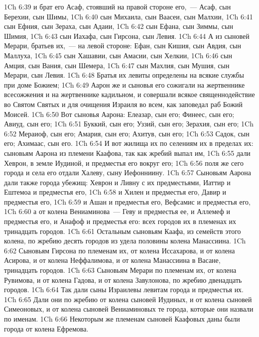\vs 1Ch 6:39 и брат его Асаф, стоявший на правой стороне его,~--- Асаф, сын Берехии, сын Шимы,
\vs 1Ch 6:40 сын Михаила, сын Ваасеи, сын Малхии,
\vs 1Ch 6:41 сын Ефния, сын Зераха, сын Адаии,
\vs 1Ch 6:42 сын Ефана, сын Зиммы, сын Шимия,
\vs 1Ch 6:43 сын Иахафа, сын Гирсона, сын Левия.
\rsbpar\vs 1Ch 6:44 А из сыновей Мерари, братьев их,~--- на левой стороне: Ефан, сын Кишия, сын Авдия, сын Маллуха,
\vs 1Ch 6:45 сын Хашавии, сын Амасии, сын Хелкии,
\vs 1Ch 6:46 сын Амция, сын Вания, сын Шемера,
\vs 1Ch 6:47 сын Махлия, сын Мушия, сын Мерари, сын Левия.
\vs 1Ch 6:48 Братья их левиты определены на всякие службы при доме Божием;
\rsbpar\vs 1Ch 6:49 Аарон же и сыновья его сожигали на жертвеннике всесожжения и на жертвеннике кадильном, и совершали всякое священнодействие во Святом Святых и для очищения Израиля во всем, как заповедал раб Божий Моисей.
\vs 1Ch 6:50 Вот сыновья Аарона: Елеазар, сын его; Финеес, сын его; Авиуд, сын его;
\vs 1Ch 6:51 Буккий, сын его; Уззий, сын его; Зерахия, сын его;
\vs 1Ch 6:52 Мераиоф, сын его; Амария, сын его; Ахитув, сын его;
\vs 1Ch 6:53 Садок, сын его; Ахимаас, сын его.
\rsbpar\vs 1Ch 6:54 И вот жилища их по селениям их в пределах их: сыновьям Аарона из племени Каафова, так как жребий выпал им,
\vs 1Ch 6:55 дали Хеврон, в земле Иудиной, и предместья его вокруг его;
\vs 1Ch 6:56 поля же сего города и села его отдали Халеву, сыну Иефонниину.
\vs 1Ch 6:57 Сыновьям Аарона дали также города убежищ: Хеврон и Ливну с их предместьями, Иаттир и Ештемоа и предместья его,
\vs 1Ch 6:58 и Хилен и предместья его, Давир и предместья его,
\vs 1Ch 6:59 и Ашан и предместья его, Вефсамис и предместья его,
\vs 1Ch 6:60 а от колена Вениаминова~--- Геву и предместья ее, и Аллемеф и предместья его, и Анафоф и предместья его: всех городов их в племенах их тринадцать городов.
\vs 1Ch 6:61 Остальным сыновьям Каафа, из семейств этого колена,  по жребию десять городов из удела половины колена Манассиина.
\vs 1Ch 6:62 Сыновьям Гирсона по племенам их, от колена Иссахарова, и от колена Асирова, и от колена Неффалимова, и от колена Манассиина в Васане,  тринадцать городов.
\vs 1Ch 6:63 Сыновьям Мерари по племенам их, от колена Рувимова, и от колена Гадова, и от колена Завулонова,  по жребию двенадцать городов.
\rsbpar\vs 1Ch 6:64 Так дали сыны Израилевы левитам города и предместья их.
\vs 1Ch 6:65 Дали они по жребию от колена сыновей Иудиных, и от колена сыновей Симеоновых, и от колена сыновей Вениаминовых те города, которые они назвали по именам.
\vs 1Ch 6:66 Некоторым же племенам сыновей Каафовых даны были города от колена Ефремова.
